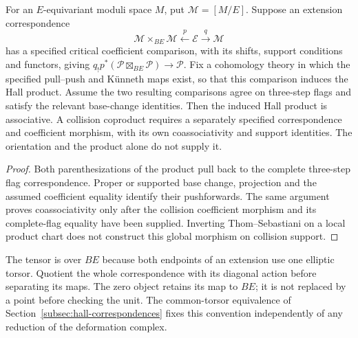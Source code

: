 \begin{proposition}
\label{prop:orientation-descent-hall-product}
\label{prop:orientation-descent-hall-coproduct}
\label{prop:finite-dcritical-hall-product}
For an \(E\)-equivariant moduli space \(M\), put
\(\mathcal M=[M/E]\).  Suppose an extension correspondence
\[
 \mathcal M\times_{BE}\mathcal M\xleftarrow{p}\mathcal E
 \xrightarrow{q}\mathcal M
\]
has a specified critical coefficient comparison, with its shifts,
support conditions and functors, giving
\(q_!p^*(\mathcal P\boxtimes_{BE}\mathcal P)\to\mathcal P\).
Fix a cohomology theory in which the specified pull--push and
K\"unneth maps exist, so that this comparison induces the Hall product.
Assume the two resulting comparisons agree on three-step flags and
satisfy the relevant base-change identities.  Then the induced Hall
product is associative.  A collision coproduct requires a separately
specified correspondence and coefficient morphism, with its own
coassociativity and support identities.  The orientation and the
product alone do not supply it.
\end{proposition}
\begin{proof}
Both parenthesizations of the product pull back to the complete
three-step flag correspondence.  Proper or supported base change,
projection and the assumed coefficient equality identify their
pushforwards.  The same argument proves coassociativity only after
the collision coefficient morphism and its complete-flag equality
have been supplied.  Inverting Thom--Sebastiani on a local product
chart does not construct this global morphism on collision support.
\end{proof}

The tensor is over \(BE\) because both endpoints of an extension use
one elliptic torsor.  Quotient the whole correspondence with its
diagonal action before separating its maps.  The zero object retains
its map to \(BE\); it is not replaced by a point before checking the
unit.  The common-torsor equivalence of
Section~\ref{subsec:hall-correspondences} fixes this convention independently
of any reduction of the deformation complex.


